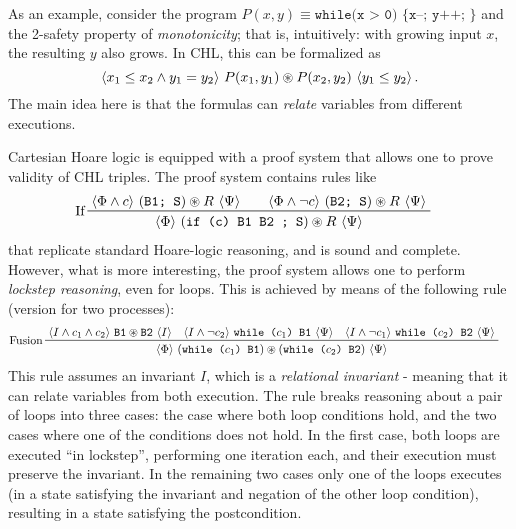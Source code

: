 As an example, consider the program $P(x,y) \equiv \texttt{while(x > 0) \{ x--; y++; \} }$ and the 2-safety property
of \emph{monotonicity}; that is, intuitively: with growing input $x$, the resulting $y$ also grows.
In CHL, this can be formalized as
\begin{equation}\label{eq:mono_formula}
\langle x_1 \leq x_2 \land y_1 = y_2  \rangle\ P(x_1, y_1)\circledast{}P(x_2, y_2)\  \langle y_1 \leq y_2 \rangle \, .
\end{equation}
The main idea here is that the formulas can \emph{relate} variables from different executions.

Cartesian Hoare logic is equipped with a proof system that allows one to prove validity of CHL triples.
The proof system contains rules like
\begin{align}\label{chlRule:If}
    & \prftree[l]{If}
      { %
        { \chl{\Phi \land c}{(\texttt{B1; S}) \st R}{\Psi} } \qquad
        { \chl{\Phi \land \neg c}{(\texttt{B2; S}) \st R}{\Psi} }
      }
      { \chl{\Phi}{(\texttt{if (c) {B1} {B2} ; S}) \st R}{\Psi} }
\end{align}
that replicate standard Hoare-logic reasoning, and is sound and complete.
However, what is more interesting, the proof system allows one to perform \emph{lockstep reasoning},
even for loops. This is achieved by means of the following rule (version for two processes):
\begin{align*}
  & \prftree[l]{Fusion}
    {
    \chl{I \land c_1 \land c_2}{\texttt{B1} \st \texttt{B2}}{I} \quad
    \chl{I \land \neg c_2}{\texttt{while (}c_1\texttt{) {B1}}}{\Psi} \quad
    \chl{I \land \neg c_1}{\texttt{while (}c_2\texttt{) {B2}}}{\Psi}    
  }
  { \chl{\Phi}{(\texttt{while (}c_1\texttt{) {B1}}) \st (\texttt{while (}c_2\texttt{) {B2}})} {\Psi}}
\end{align*}
This rule assumes an invariant $I$, which is a \emph{relational invariant} - meaning that it can relate variables
from both execution.
%
The rule breaks reasoning about a pair of loops into three cases: the case
where both loop conditions hold, and the two cases where one of the conditions
does not hold.  In the first case, both loops are executed ``in lockstep'',
performing one iteration each, and their execution must preserve the
invariant. In the remaining two cases only one of the loops executes (in a
state satisfying the invariant and negation of the other loop condition),
resulting in a state satisfying the postcondition.


